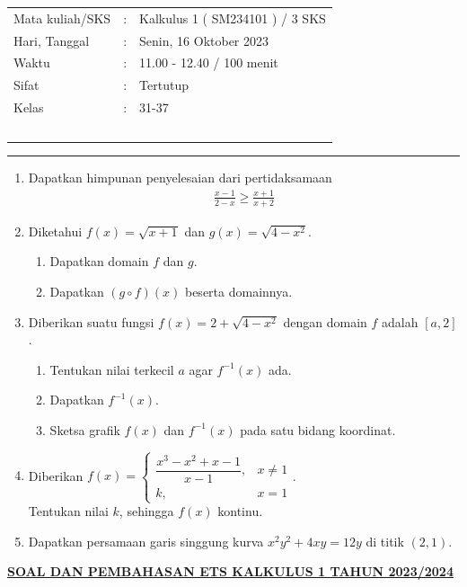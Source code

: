 \documentclass[10pt,openany,a4paper]{article}
\theoremstyle{definition}
\theoremstyle{definition}
\theoremstyle{plain}
\begin{document}
    \begin{center}
	\begin{tabular}{lcl}
		Mata kuliah/SKS & : & Kalkulus 1 ( SM234101 ) / 3 SKS\\
		Hari, Tanggal & : & Senin, 16 Oktober 2023\\
		Waktu & : & 11.00 - 12.40 / 100 menit\\
		Sifat & : & Tertutup\\
		Kelas & : & 31-37\\
  ~
	\end{tabular}

    \noindent\rule{\textwidth}{2.pt}
        \end{center}
    \begin{enumerate}
    \item Dapatkan himpunan penyelesaian dari pertidaksamaan
    \begin{align*}
        \frac{x-1}{2-x}\geq\frac{x+1}{x+2}
    \end{align*}

    \item Diketahui $f(x)=\sqrt{x+1}$ dan $g(x)=\sqrt{4-x^2}$.
    \begin{enumerate}
        \item Dapatkan domain $f$ dan $g$.
        \item Dapatkan $(g\circ f)(x)$ beserta domainnya.
    \end{enumerate}

    \item Diberikan suatu fungsi $f(x)=2+\sqrt{4-x^2}$ dengan domain $f$ adalah $[a,2]$.
    \begin{enumerate}
        \item Tentukan nilai terkecil $a$ agar $f^{-1}(x)$ ada.
        \item Dapatkan $f^{-1}(x)$.
        \item Sketsa grafik $f(x)$ dan $f^{-1}(x)$ pada satu bidang koordinat.
    \end{enumerate}

    \item Diberikan $f(x)=\begin{cases}
        \dfrac{x^3-x^2+x-1}{x-1}, & x\neq 1\\
        k, & x=1
    \end{cases}$.\\
    Tentukan nilai $k$, sehingga $f(x)$ kontinu.

    \item Dapatkan persamaan garis singgung kurva $x^2y^2+4xy=12y$ di titik $(2,1)$.
\end{enumerate}
\newpage
 \begin{center}
	{\underline{\textbf{\MakeUppercase{Soal dan Pembahasan ETS Kalkulus 1 Tahun 2023/2024}}}}
    \end{center}
\end{document}
